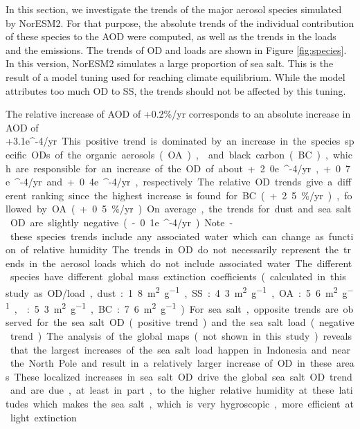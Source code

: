 \documentclass[acp, manuscript]{copernicus}
\begin{document}
In this section, we investigate the trends of the major aerosol species simulated by NorESM2. For that purpose, the absolute trends of the individual contribution of these species to the AOD were computed, as well as the trends in the loads and the emissions. The trends of OD and loads are shown in Figure \ref{fig:species}. In this version, NorESM2 simulates a large proportion of sea salt. This is the result of a model tuning used for reaching climate equilibrium. While the model attributes too much OD to SS, the trends should not be affected by this tuning.

The relative increase of AOD of +0.2\%/yr corresponds to an absolute increase in AOD of +3.1e\unit{^{-4}/yr}. This positive trend is dominated by an increase in the species specific ODs of the organic aerosols (OA),  and black carbon (BC), which are responsible for an increase of the OD of about +2.0e\unit{^{-4}/yr}, +0.7e\unit{^{-4}/yr} and +0.4e\unit{^{-4}/yr}, respectively. The relative OD trends give a different ranking since the highest increase is found for BC (+2.5\%/yr), followed by OA (+0.5 \%/yr). On average, the trends for dust and sea salt OD are slightly negative (-0.1e\unit{^{-4}/yr}). Note - these species trends include any associated water which can change as function of relative humidity.

The trends in OD do not necessarily represent the trends in the aerosol loads which do not include associated water. The different species have different global mass extinction coefficients (calculated in this study as OD/load, dust: 1.8 \unit{m^{2} g^{-1}}, SS: 4.3 \unit{m^{2} g^{-1}}, OA: 5.6 \unit{m^{2} g^{-1}}, : 5.3 \unit{m^{2} g^{-1}}, BC: 7.6 \unit{m^{2} g^{-1}}). For sea salt, opposite trends are observed for the sea salt OD (positive trend) and the sea salt load (negative trend). The analysis of the global maps (not shown in this study) reveals that the largest increases of the sea salt load  happen in Indonesia and near the North Pole and result in a relatively larger increase of OD in these areas. These localized increases in sea salt OD drive the global sea salt OD trend and are due, at least in part, to the higher relative humidity at these latitudes which makes the sea salt, which is very hygroscopic, more efficient at light extinction.


\conclusions  %
\end{document}
